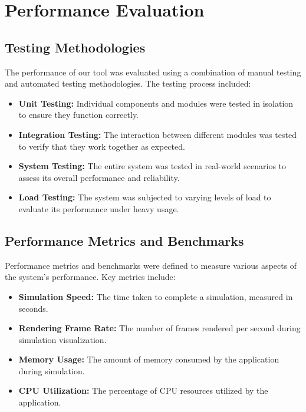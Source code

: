 \chapter{Performance Evaluation}

\section{Testing Methodologies}

The performance of our tool was evaluated using a combination of manual testing and automated testing methodologies. The testing process included:

\begin{itemize}
    \item \textbf{Unit Testing:} Individual components and modules were tested in isolation to ensure they function correctly.
    \item \textbf{Integration Testing:} The interaction between different modules was tested to verify that they work together as expected.
    \item \textbf{System Testing:} The entire system was tested in real-world scenarios to assess its overall performance and reliability.
    \item \textbf{Load Testing:} The system was subjected to varying levels of load to evaluate its performance under heavy usage.
\end{itemize}

\section{Performance Metrics and Benchmarks}

Performance metrics and benchmarks were defined to measure various aspects of the system's performance. Key metrics include:

\begin{itemize}
    \item \textbf{Simulation Speed:} The time taken to complete a simulation, measured in seconds.
    \item \textbf{Rendering Frame Rate:} The number of frames rendered per second during simulation visualization.
    \item \textbf{Memory Usage:} The amount of memory consumed by the application during simulation.
    \item \textbf{CPU Utilization:} The percentage of CPU resources utilized by the application.
\end{itemize}

